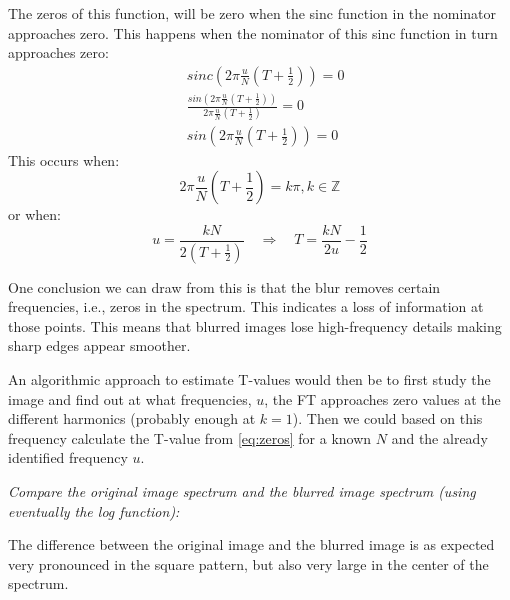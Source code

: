 The zeros of this function, will be zero when the sinc function in the nominator approaches zero. This happens when the nominator of this sinc function in turn approaches zero:
\begin{equation}
\begin{split}
    &sinc (2 \pi \frac{u}{N}(T + \frac{1}{2})) = 0 \\
    & \frac{sin( 2 \pi \frac{u}{N}(T + \frac{1}{2}) )}{2 \pi \frac{u}{N}(T + \frac{1}{2})} = 0 \\
    & sin(2 \pi \frac{u}{N}(T + \frac{1}{2})) = 0
\end{split}
\end{equation}
This occurs when:
\[
2 \pi \frac{u}{N}(T + \frac{1}{2}) = k \pi, k \in \mathbb{Z}
\]
or when:
\begin{equation}
\label{eq:zeros}
u = \frac{k N}{2 (T + \frac{1}{2})}
\quad \Rightarrow \quad
T = \frac{k N}{2 u} - \frac{1}{2} 
\end{equation}

One conclusion we can draw from this is that the blur removes certain frequencies, i.e., zeros in the spectrum. This indicates a loss of information at those points. This means that blurred images lose high-frequency details making sharp edges appear smoother.

An algorithmic approach to estimate T-values would then be to first study the image and find out at what frequencies, $u$, the FT approaches zero values at the different harmonics (probably enough at $k=1$). 
Then we could based on this frequency calculate the T-value from \autoref{eq:zeros} for a known $N$ and the already identified frequency $u$. 


\textit{Compare the original image spectrum and the blurred image spectrum (using eventually the log function):}

The difference between the original image and the blurred image is as expected very pronounced in the square pattern, but also very large in the center of the spectrum.

